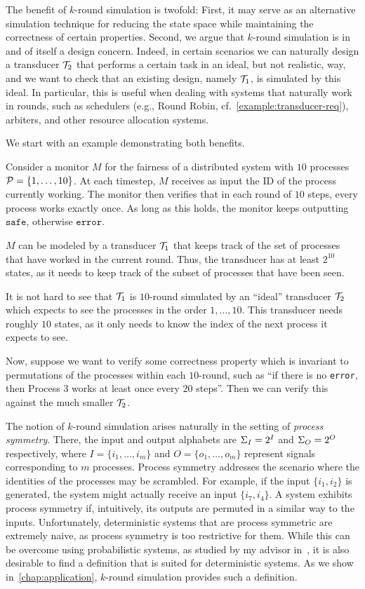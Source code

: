 The benefit of $k$-round simulation is twofold: First, it may serve as an alternative simulation technique for reducing the state space while maintaining the correctness of certain properties. Second, we argue that $k$-round simulation is in and of itself a design concern. Indeed, in certain scenarios we can naturally design a transducer $\mathcal{T}_2$ that performs a certain task in an ideal, but not realistic, way, and we want to check that an existing design, namely $\mathcal{T}_1$, is simulated by this ideal. In particular, this is useful when dealing with systems that naturally work in rounds, such as schedulers (e.g., Round Robin, cf.~\cref{example:transducer-req}), arbiters, and other resource allocation systems.

We start with an example demonstrating both benefits.
\begin{example}
\label{example:MC_rounds}
Consider a monitor $M$ for the fairness of a distributed system with $10$ processes $\mathcal{P}=\{1,\ldots,10\}$. At each timestep, $M$ receives as input the ID of the process currently working. The monitor then verifies that in each round of $10$ steps, every process works exactly once. As long as this holds, the monitor keeps outputting $\texttt{safe}$, otherwise $\texttt{error}$.

$M$ can be modeled by a transducer $\mathcal{T}_1$ that keeps track of the set of processes that have worked in the current round. Thus, the transducer has at least $2^{10}$ states, as it needs to keep track of the subset of processes that have been seen.

It is not hard to see that $\mathcal{T}_1$ is $10$-round simulated by an ``ideal'' transducer $\mathcal{T}_2$ which expects to see the processes in the order $1,\ldots,10$. This transducer needs roughly $10$ states, as it only needs to know the index of the next process it expects to see.

Now, suppose we want to verify some correctness property which is invariant to permutations of the processes within each $10$-round, such as ``if there is no \texttt{error}, then Process $3$ works at least once every 20 steps''. Then we can verify this against the much smaller $\mathcal{T}_2$.
\end{example}

The notion of $k$-round simulation arises naturally in the setting of \emph{process symmetry}. There, the input and output alphabets are $\Sigma_{I}=2^{I}$ and $\Sigma_{O}=2^{O}$ respectively, where $I=\{i_1,\ldots,i_m\}$ and $O=\{o_1,\ldots,o_m\}$ represent signals corresponding to $m$ processes. Process symmetry addresses the scenario where the identities of the processes may be scrambled. For example, if the input $\{i_1,i_2\}$ is generated, the system might actually receive an input $\{i_7,i_4\}$. A system exhibits process symmetry if, intuitively, its outputs are permuted in a similar way to the inputs. Unfortunately, deterministic systems that are process symmetric are extremely naive, as process symmetry is too restrictive for them. While this can be overcome using probabilistic systems, as studied by my advisor in~\cite{Almagor2020b}, it is also desirable to find a definition that is suited for deterministic systems. As we show in~\cref{chap:application}, $k$-round simulation provides such a definition.

